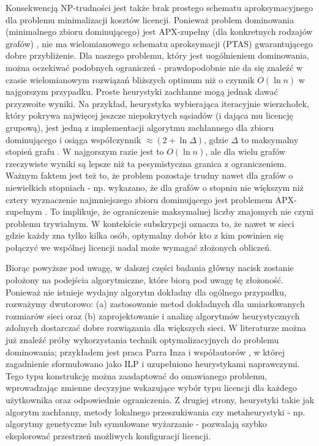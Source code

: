 Konsekwencją NP-trudności jest także brak prostego schematu aproksymacyjnego dla problemu minimalizacji kosztów licencji. Ponieważ problem dominowania (minimalnego zbioru dominującego) jest APX-zupełny (dla konkretnych rodzajów grafów) \cite{POUREIDI2023106363}, nie ma wielomianowego schematu aproksymacji (PTAS) gwarantującego dobre przybliżenie. Dla naszego problemu, który jest uogólnieniem dominowania, można oczekiwać podobnych ograniczeń - prawdopodobnie nie da się znaleźć w czasie wielomianowym rozwiązań bliższych optimum niż o czynnik $O(\ln n)$ w najgorszym przypadku. Proste heurystyki zachłanne mogą jednak dawać przyzwoite wyniki. Na przykład, heurystyka wybierająca iteracyjnie wierzchołek, który pokrywa najwięcej jeszcze niepokrytych sąsiadów (i dająca mu licencję grupową), jest jedną z implementacji algorytmu zachłannego dla zbioru dominującego i osiąga współczynnik $\approx (2 + \ln \Delta)$, gdzie $\Delta$ to maksymalny stopień grafu \cite{Kuhn2012NetworkAlgorithms}. W najgorszym razie jest to $O(\ln n)$, ale dla wielu grafów rzeczywiste wyniki są lepsze niż ta pesymistyczna granica z ograniczeniem. Ważnym faktem jest też to, że problem pozostaje trudny nawet dla grafów o niewielkich stopniach - np. wykazano, że dla grafów o stopniu nie większym niż cztery wyznaczenie najmniejszego zbioru dominującego jest problemem APX-zupełnym \cite{ALIMONTI2000123,POUREIDI2023106363}.
To implikuje, że ograniczenie maksymalnej liczby znajomych nie czyni problemu trywialnym. W kontekście subskrypcji oznacza to, że nawet w sieci gdzie każdy zna tylko kilka osób, optymalny dobór kto z kim powinien się połączyć we wspólnej licencji nadal może wymagać złożonych obliczeń.

Biorąc powyższe pod uwagę, w dalszej części badania główny nacisk zostanie położony na podejścia algorytmiczne, które biorą pod uwagę tę złożoność. Ponieważ nie istnieje wydajny algorytm dokładny dla ogólnego przypadku, rozważymy dwutorowo: (a) zastosowanie metod dokładnych dla umiarkowanych rozmiarów sieci oraz (b) zaprojektowanie i analizę algorytmów heurystycznych zdolnych dostarczać dobre rozwiązania dla większych sieci. W literaturze można już znaleźć próby wykorzystania technik optymalizacyjnych do problemu dominowania; przykładem jest praca Parra Inza i współautorów \cite{PARRAINZA2024926}, w której zagadnienie sformułowano jako ILP i uzupełniono heurystykami naprawczymi. Tego typu konstrukcję można zaadaptować do omawianego problemu, wprowadzając zmienne decyzyjne wskazujące wybór typu licencji dla każdego użytkownika oraz odpowiednie ograniczenia. Z drugiej strony, heurystyki takie jak algorytm zachłanny, metody lokalnego przeszukiwania czy metaheurystyki - np. algorytmy genetyczne lub symulowane wyżarzanie - pozwalają szybko eksplorować przestrzeń możliwych konfiguracji licencji.
